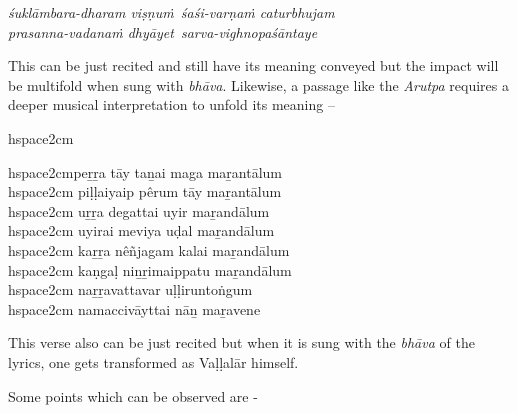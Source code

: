 \begin{myquote}
\textit{śuklāmbara-dharam viṣṇuṁ śaśi-varṇaṁ caturbhujam }\\ \textit{prasanna-vadanaṁ dhyāyet sarva-vighnopaśāntaye }
\end{myquote}

This can be just recited and still have its meaning conveyed but the impact will be multifold when sung with \textit{bhāva}. Likewise, a passage like the \textit{Arutpa} requires a deeper musical interpretation to unfold its meaning –

\begin{myquote}
hspace{2cm}
\end{myquote}

\begin{myquote}
hspace{2cm}peṟṟa tāy taṉai maga maṟantālum\\hspace{2cm} piḷḷaiyaip pêrum tāy maṟantālum\\hspace{2cm} uṟṟa degattai uyir maṟandālum\\hspace{2cm} uyirai meviya uḍal maṟandālum\\hspace{2cm} kaṟṟa nêñjagam kalai maṟandālum\\hspace{2cm} kaṇgaḷ niṉṟimaippatu maṟandālum\\hspace{2cm} naṟṟavattavar uḷḷiruntoṅgum\\hspace{2cm} namaccivāyttai nāṉ maṟavene
\end{myquote}

This verse also can be just recited but when it is sung with the \textit{bhāva} of the lyrics, one gets transformed as Vaḷḷalār himself.

Some points which can be observed are -

\vspace{-.3cm}

